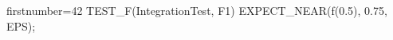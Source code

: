 \begin{cppcode*}{firstnumber=42}
TEST_F(IntegrationTest, F1) {
    EXPECT_NEAR(f(0.5), 0.75, EPS);
}
\end{cppcode*}
